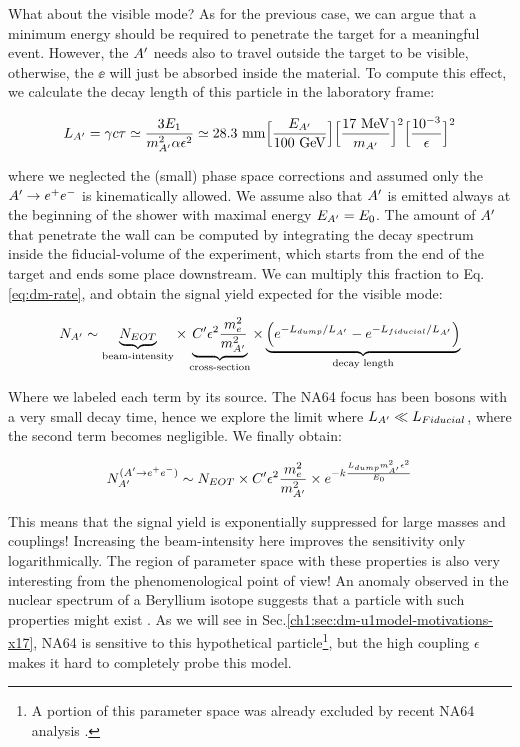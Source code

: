 What about the visible mode? As for the previous case, we can argue that a minimum energy should be required to penetrate the target for a meaningful event. However, the $A'$ needs also to travel outside the target to be visible, otherwise, the $\ee$ will just be absorbed inside the material. To compute this effect, we calculate the decay length of this particle in the laboratory frame:

\begin{eqnarray}
  L_{A'} = \gamma c \tau \simeq \frac{3E_1}{m^2_{A'}\alpha \epsilon^2} \simeq 28.3 ~{\rm mm}  \Bigl[\frac{E_{A'}}{100~ {\rm GeV}}\Bigr] 
  \Bigl[\frac{17~ {\rm MeV}}{m_{A'}}\Bigr]^2 \Bigl[\frac{10^{-3}}{\epsilon}\Bigr]^2
  \label{eq:dm-decay-length}
\end{eqnarray}

where we neglected the (small) phase space corrections and assumed only the $A' \to e^+e^-$ is kinematically allowed. We assume also that $A'$ is emitted always at the beginning of the shower with maximal energy $E_{A'} = E_0$. The amount of $A'$ that penetrate the wall can be computed by integrating the decay spectrum inside the fiducial-volume of the experiment, which starts from the end of the target and ends some place downstream. We can multiply this fraction to Eq.\ref{eq:dm-rate}, and obtain the signal yield expected for the visible mode:

\begin{equation}
  \label{eq:dm-rate-vis}
    N_{A'} \sim \underbrace{N_{EOT}}_{\textrm{beam-intensity}} \times \underbrace{C' \epsilon^2 \frac{m_e^2}{m^2_{A'}}}_{\textrm{cross-section}} \times \underbrace{\left(e^{- L_{dump}/L_{A'}} - e^{-L_{fiducial}/L_{A'}}\right)}_{\textrm{decay length}}
  \end{equation}

  Where we labeled each term by its source. The NA64 focus has been bosons with a very small decay time, hence we explore the limit where $L_{A'} \ll L_{Fiducial}$, where the second term becomes negligible. We finally obtain:

  \begin{equation}
    \label{eq:dm-rate-vis-limit}
    N_{A'}^{(A' \to e^+e^-)} \sim N_{EOT} \times C' \epsilon^2 \frac{m_e^2}{m^2_{A'}} \times e^{-k\frac{L_{dump} m^2_{A'}\epsilon^2}{E_0}}
  \end{equation}

  This means that the signal yield is exponentially suppressed for large masses and couplings! Increasing the beam-intensity here improves the sensitivity only logarithmically. The region of parameter space with these properties is also very interesting from the phenomenological point of view! An anomaly observed in the nuclear spectrum of a Beryllium isotope suggests that a particle with such properties might exist \cite{Krasznahorkay:2015iga}. As we will see in Sec.\ref{ch1:sec:dm-u1model-motivations-x17}, NA64 is sensitive to this hypothetical particle\footnote{A portion of this parameter space was already excluded by recent NA64 analysis \cite{Banerjee:2019hmi,Banerjee:2018vgk}.}, but the high coupling $\epsilon$ makes it hard to completely probe this model.

